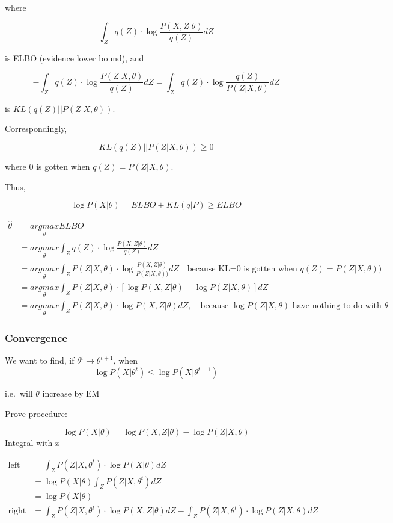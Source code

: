 \documentclass[
]{article}
\begin{document}
where

\[\int_Z q(Z)\cdot \log\frac {P(X,Z|\theta)} {q(Z)}dZ\]

is ELBO (evidence lower bound), and

\[-\int_Z q(Z)\cdot \log\frac{P(Z|X,\theta)} {q(Z)}dZ=\int_Z q(Z)\cdot \log\frac {q(Z)}{P(Z|X,\theta)}dZ\]

is \(KL(q(Z)||P(Z|X,\theta))\).

Correspondingly,

\[KL(q(Z)||P(Z|X,\theta)) \geq 0\]

where 0 is gotten when \(q(Z)=P(Z|X,\theta)\).

Thus,

\[\log P(X|\theta)=ELBO+KL(q|P)\geq ELBO\]

\begin{align}

\hat \theta&=\underset \theta {argmax} ELBO\\

&=\underset \theta {argmax}\int_Z q(Z)\cdot \log\frac {P(X,Z|\theta)} {q(Z)}dZ\\

& =\underset \theta {argmax}\int_Z P(Z|X,\theta)\cdot \log\frac {P(X,Z|\theta)} {P(Z|X,\theta))}dZ \quad \text{because KL=0 is gotten when $q(Z)=P(Z|X,\theta)$)}\\

&= \underset \theta {argmax}\int_Z P(Z|X,\theta)\cdot [\log P(X,Z|\theta)-\log P(Z|X,\theta)]dZ\\

&= \underset \theta {argmax}\int_Z P(Z|X,\theta)\cdot \log P(X,Z|\theta)dZ, \quad \text{because $\log P(Z|X,\theta)$ have nothing to do with $\theta$}

\end{align}

\hypertarget{convergence}{%
\subsubsection{Convergence}\label{convergence}}

We want to find, if \(\theta^t \rightarrow \theta^{t+1}\), when
\[\log P(X|\theta^t)\leq \log P(X|\theta^{t+1})\]

i.e.~will \(\theta\) increase by EM

Prove procedure:

\[\log P(X|\theta)=\log P(X,Z|\theta)-\log P(Z|X,\theta)\] Integral with
z

\begin{align}

\text{left} &=\int_Z P(Z|X,\theta^t)\cdot \log P(X|\theta)dZ\\

& =\log P(X|\theta)\int_Z P(Z|X,\theta^t)dZ\\
 
& = \log P(X|\theta)\\

\text{right}&= \int_Z P(Z|X,\theta^t)\cdot \log P(X,Z|\theta)dZ-\int_Z P(Z|X,\theta^t)\cdot \log P(Z|X,\theta)dZ\\

\end{align}
\end{document}
